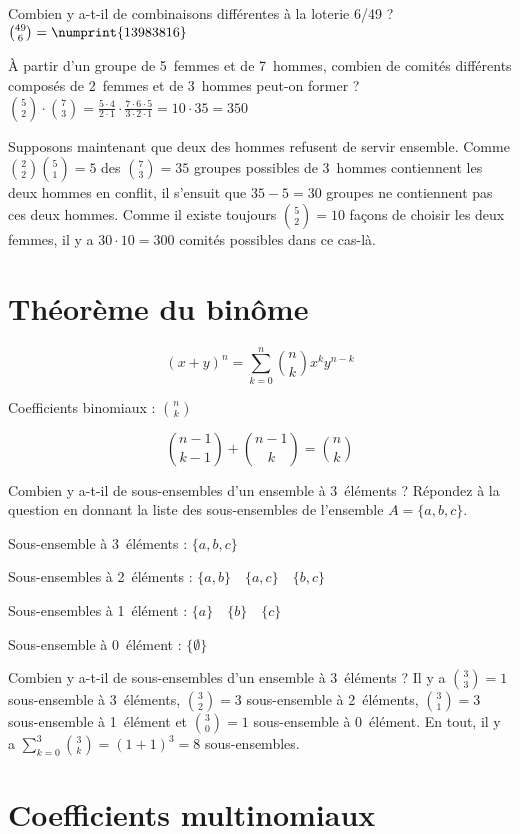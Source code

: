  Combien y a-t-il de combinaisons différentes à la loterie 6/49 ?
\sol $\binom{49}{6} = \numprint{13983816}$

\noindent À partir d’un groupe de 5~femmes et de 7~hommes, combien de comités différents composés
de 2~femmes et de 3~hommes peut-on former ?
 $\binom{5}{2} \cdot \binom{7}{3} = \frac{5 \cdot 4}{2 \cdot 1} \cdot \frac{7 \cdot 6 \cdot 5}{3 \cdot 2 \cdot 1} = 10 \cdot 35 = 350$

Supposons maintenant que deux des hommes refusent de servir ensemble. Comme $\binom{2}{2}\binom{5}{1}=5$ des $\binom{7}{3}=35$ groupes possibles de 3~hommes contiennent les deux hommes en conflit, il s’ensuit que $35-5=30$ groupes ne contiennent pas ces deux hommes. Comme il existe toujours $\binom{5}{2}=10$ façons de choisir les deux femmes, il y a $30 \cdot 10 = 300$ comités possibles dans ce cas-là.


\section{Théorème du binôme}
\[(x+y)^n = \sum_{k=0}^{n}\binom{n}{k}x^ky^{n-k}\]

Coefficients binomiaux : $\binom{n}{k}$

\[\binom{n-1}{k-1} + \binom{n-1}{k} = \binom{n}{k}\]

 Combien y a-t-il de sous-ensembles d’un ensemble à 3~éléments ? Répondez à la question en donnant la liste des sous-ensembles de l’ensemble $A = \{a,b,c\}$.
\sol

Sous-ensemble à 3~éléments : $\{a,b,c\}$

Sous-ensembles à 2~éléments : $\{a,b\} \quad \{a,c\} \quad \{b,c\}$

Sous-ensembles à 1~élément : $\{a\} \quad \{b\} \quad \{c\}$

Sous-ensemble à 0~élément : $\{\emptyset\}$

\noindent Combien y a-t-il de sous-ensembles d’un ensemble à 3~éléments ?
 Il y a $\binom{3}{3}=1$ sous-ensemble à 3~éléments, $\binom{3}{2}=3$ sous-ensemble à 2~éléments, $\binom{3}{1}=3$ sous-ensemble à 1~élément et $\binom{3}{0}=1$ sous-ensemble à 0~élément. En tout, il y a $\sum_{k=0}^{3}\binom{3}{k} = (1+1)^3 = 8$ sous-ensembles.

\section{Coefficients multinomiaux}

